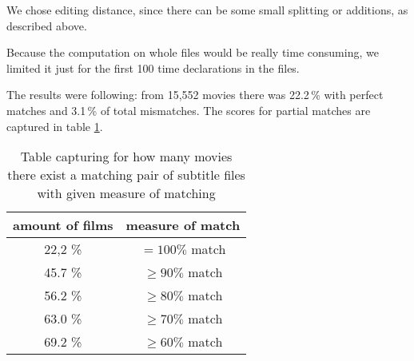 We chose editing distance, since there can be some small splitting or additions, as described above.

Because the computation on whole files would be really time consuming, we limited it just for the first 100 time declarations in the files.




The results were following: from 15,552 movies there was 22.2\,\%
with perfect matches and 3.1\,\% of total mismatches. The scores for partial matches are captured in table \ref{opensubtitles:matchTable}.

\begin{table}[h]

\begin{center}
\begin{tabular}{|c|c|}
\hline
amount of films & measure of match\\ \hline
22,2 \% & $= 100 \%$ match \\
45.7 \% & $\ge 90 \%$ match \\ 
56.2 \% & $\ge 80 \%$ match \\ 
63.0 \% & $\ge 70 \%$ match \\
69.2 \% & $\ge 60 \%$ match \\ \hline
\end{tabular}
\end{center}

\caption{Table capturing for how many movies there exist a matching pair of subtitle files with given measure of matching}\label{opensubtitles:matchTable}
\end{table}

